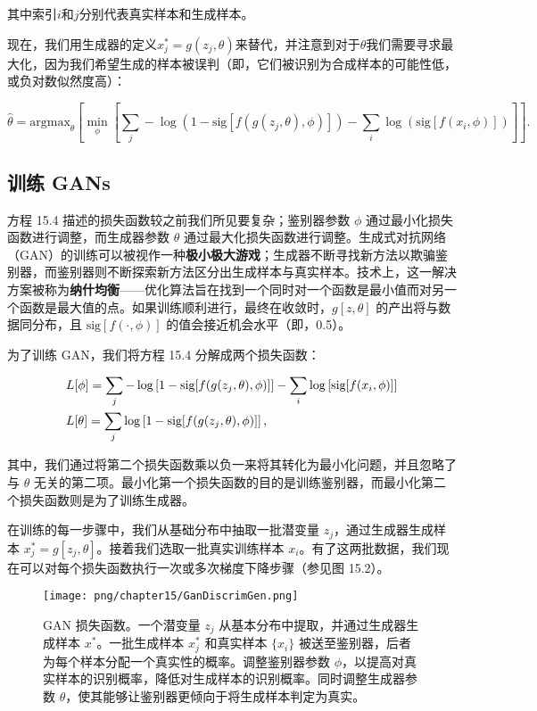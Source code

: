 其中索引\(i\)和\(j\)分别代表真实样本和生成样本。

现在，我们用生成器的定义\(x_j^* = g(z_j, \theta)\)来替代，并注意到对于\(\theta\)我们需要寻求最大化，因为我们希望生成的样本被误判（即，它们被识别为合成样本的可能性低，或负对数似然度高）：

\begin{equation}
\hat{\theta} = \text{argmax}_{\theta} \left[ \min_{\phi} \left[ \sum_j -\log \left(1 - \text{sig}[f(g(z_j, \theta), \phi)] \right) - \sum_i \log \left( \text{sig}[f(x_i, \phi)] \right) \right]  \right]. 
\end{equation}

\subsection{训练 GANs}
方程 15.4 描述的损失函数较之前我们所见要复杂；鉴别器参数 \(\phi\) 通过最小化损失函数进行调整，而生成器参数 \(\theta\) 通过最大化损失函数进行调整。生成式对抗网络（GAN）的训练可以被视作一种\textbf{极小极大游戏}；生成器不断寻找新方法以欺骗鉴别器，而鉴别器则不断探索新方法区分出生成样本与真实样本。技术上，这一解决方案被称为\textbf{纳什均衡}——优化算法旨在找到一个同时对一个函数是最小值而对另一个函数是最大值的点。如果训练顺利进行，最终在收敛时，\(g[z, \theta]\) 的产出将与数据同分布，且 \(\text{sig}[f(\cdot, \phi)]\) 的值会接近机会水平（即，0.5）。

为了训练 GAN，我们将方程 15.4 分解成两个损失函数：


\begin{align}
&L[\phi] = \sum_j -\log \left[ 1 - \text{sig}[f(g(z_j, \theta), \phi)] \right] - \sum_i \log \left[ \text{sig}[f(x_i, \phi)] \right] \notag \\
&L[\theta] = \sum_j \log \left[ 1 - \text{sig}[f(g(z_j, \theta), \phi)] \right], 
\end{align} 


其中，我们通过将第二个损失函数乘以负一来将其转化为最小化问题，并且忽略了与 \(\theta\) 无关的第二项。最小化第一个损失函数的目的是训练鉴别器，而最小化第二个损失函数则是为了训练生成器。

在训练的每一步骤中，我们从基础分布中抽取一批潜变量 \(z_j\)，通过生成器生成样本 \(x_j^* = g[z_j, \theta]\)。接着我们选取一批真实训练样本 \(x_i\)。有了这两批数据，我们现在可以对每个损失函数执行一次或多次梯度下降步骤（参见图 15.2）。

\begin{figure}[ht!]
\centering
\texttt{[image: png/chapter15/GanDiscrimGen.png]}
\caption{GAN 损失函数。一个潜变量 \(z_j\) 从基本分布中提取，并通过生成器生成样本 \( x^* \)。一批生成样本 \( x_j^* \) 和真实样本 \(\{x_i\}\) 被送至鉴别器，后者为每个样本分配一个真实性的概率。调整鉴别器参数 \(\phi\)，以提高对真实样本的识别概率，降低对生成样本的识别概率。同时调整生成器参数 \(\theta\)，使其能够让鉴别器更倾向于将生成样本判定为真实。}
\end{figure}


